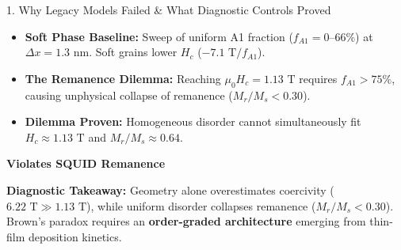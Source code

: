 \documentclass[aspectratio=169, 10pt]{beamer}
\begin{document}
\begin{frame}{1. Why Legacy Models Failed \& What Diagnostic Controls Proved}
\begin{tcbraster}[raster columns=3, raster equal height, raster column skip=2.5mm]
  \begin{tcolorbox}[colback=cardbg!5!white, colframe=accentorange, title=\textbf{Uniform Disorder (M1)}, fonttitle=\scriptsize\bfseries, fontupper=\tiny]
    \begin{itemize}\setlength{\itemsep}{1pt}
      \item \textbf{Soft Phase Baseline:} Sweep of uniform A1 fraction ($f_{A1}=0\text{--}66\%$) at $\Delta x = 1.3\text{ nm}$. Soft grains lower $H_c$ ($-7.1\text{ T}/f_{A1}$).
      \item \textbf{The Remanence Dilemma:} Reaching $\mu_0 H_c = 1.13\text{ T}$ requires $f_{A1} > 75\%$, causing unphysical collapse of remanence ($M_r/M_s < 0.30$).
      \item \textbf{Dilemma Proven:} Homogeneous disorder cannot simultaneously fit $H_c \approx 1.13\text{ T}$ and $M_r/M_s \approx 0.64$.
    \end{itemize}
    \vspace{2pt}
    \centering\textbf{\textcolor{accentorange}{Violates SQUID Remanence}}
  \end{tcolorbox}
\end{tcbraster}

\vspace{3mm}
\begin{tcolorbox}[colback=cardbg!10!white, colframe=accentteal, arc=2mm, fontupper=\scriptsize]
\textbf{Diagnostic Takeaway:} Geometry alone overestimates coercivity ($6.22\text{ T} \gg 1.13\text{ T}$), while uniform disorder collapses remanence ($M_r/M_s < 0.30$). Brown's paradox requires an \textbf{order-graded architecture} emerging from thin-film deposition kinetics.
\end{tcolorbox}
\end{frame}
\end{document}
